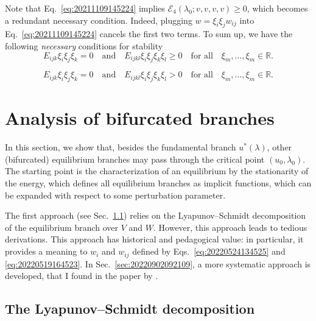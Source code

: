 \documentclass[12pt, final]{scrartcl}
\theoremstyle{definition}
\newcommand{\E}{\mathcal E}
\newcommand{\reals}{\mathbb{R}}
\begin{document}
Note that Eq.~\eqref{eq:20211109145224} implies $\E_4(\lambda_0; v, v, v, v) \geq 0$,
which becomes a redundant necessary condition. Indeed, plugging
$w= \xi_i \xi_j w_{ij}$ into Eq.~\eqref{eq:20211109145224} cancels the first two
terms. To sum up, we have the following \emph{necessary} conditions for
stability
\begin{equation}
  E_{ijk} \xi_i \xi_j \xi_k = 0 \quad \text{and} \quad E_{ijkl} \xi_i \xi_j \xi_k \xi_l \geq 0 \quad \text{for all} \quad \xi_m, \ldots, \xi_m \in \reals.
\end{equation}

\begin{equation}
  E_{ijk} \xi_i \xi_j \xi_k = 0 \quad \text{and} \quad E_{ijkl} \xi_i \xi_j \xi_k \xi_l > 0 \quad \text{for all} \quad \xi_m, \ldots, \xi_m \in \reals.
\end{equation}

\section{Analysis of bifurcated branches}
\label{sec:20220617075558}

In this section, we show that, besides the fundamental branch $u^\ast(\lambda)$,
other (bifurcated) equilibrium branches may pass through the critical point
$(u_0, \lambda_0)$. The starting point is the characterization of an equilibrium by
the stationarity of the energy, which defines all equilibrium branches as
implicit functions, which can be expanded with respect to some perturbation
parameter.

The first approach (see Sec.~\ref{sec:20220902091527}) relies on the
Lyapunov--Schmidt decomposition of the equilibrium branch over $V$ and
$W$. However, this approach leads to tedious derivations. This approach has
historical and pedagogical value: in particular, it provides a meaning to
$w_i$ and $w_{ij}$ defined by Eqs.~\eqref{eq:20220524134525} and
\eqref{eq:20220519164523}. In Sec.~\ref{sec:20220902092109}, a more systematic
approach is developed, that I found in the paper by \textcite[][Appendix
A]{chak2018}.

\subsection{The Lyapunov--Schmidt decomposition}
\label{sec:20220902091527}
\end{document}

